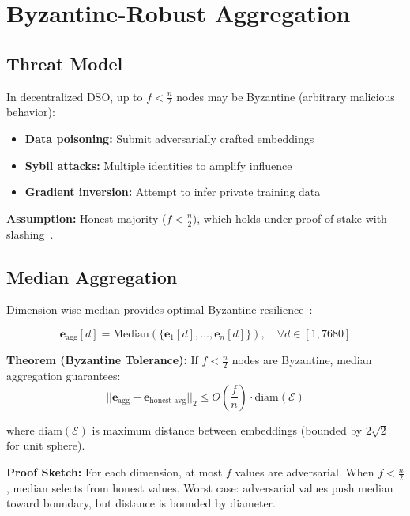 \section{Byzantine-Robust Aggregation}


\subsection{Threat Model}

In decentralized DSO, up to $f < \frac{n}{2}$ nodes may be Byzantine (arbitrary malicious behavior):
\begin{itemize}
\item \textbf{Data poisoning:} Submit adversarially crafted embeddings
\item \textbf{Sybil attacks:} Multiple identities to amplify influence
\item \textbf{Gradient inversion:} Attempt to infer private training data
\end{itemize}

\textbf{Assumption:} Honest majority ($f < \frac{n}{2}$), which holds under proof-of-stake with slashing~\cite{buterin2017casper}.

\subsection{Median Aggregation}

Dimension-wise median provides optimal Byzantine resilience~\cite{yin2018median}:

\begin{equation}
\mathbf{e}_{\text{agg}}[d] = \text{Median}(\{\mathbf{e}_1[d], \ldots, \mathbf{e}_n[d]\}), \quad \forall d \in [1, 7680]
\end{equation}

\textbf{Theorem (Byzantine Tolerance):} If $f < \frac{n}{2}$ nodes are Byzantine, median aggregation guarantees:
\begin{equation}
||\mathbf{e}_{\text{agg}} - \mathbf{e}_{\text{honest-avg}}||_2 \leq O\left(\frac{f}{n}\right) \cdot \text{diam}(\mathcal{E})
\end{equation}

where $\text{diam}(\mathcal{E})$ is maximum distance between embeddings (bounded by $2\sqrt{2}$ for unit sphere).

\textbf{Proof Sketch:} For each dimension, at most $f$ values are adversarial. When $f < \frac{n}{2}$, median selects from honest values. Worst case: adversarial values push median toward boundary, but distance is bounded by diameter.

